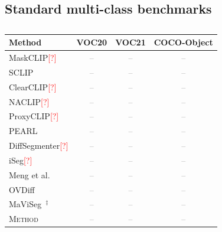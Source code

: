 \documentclass[runningheads]{llncs}
\newcommand{\method}{\textsc{Method}}          %
\newcommand{\x}{\textcolor{gray}{--}}          %
\newcommand{\citeneeded}{\textcolor{red}{[?]}} %
\newcommand{\figbox}[2]{\fbox{\parbox[c][#2][c]{0.95\linewidth}{\centering\small\textcolor{gray}{#1}}}}
\begin{document}
\subsection{Standard multi-class benchmarks}
\label{sec:res-multiclass}

\begin{table}[t]
\centering
\caption{}
\label{tab:multiclass}
\footnotesize\setlength{\tabcolsep}{4pt}
\begin{tabular}{@{}lccc@{}}
\toprule
Method & VOC20 & VOC21 & COCO-Object \\
\midrule
MaskCLIP\citeneeded                 & \x & \x & \x \\
SCLIP~\cite{wang2024sclip}                    & \x & \x & \x \\
ClearCLIP\citeneeded                & \x & \x & \x \\
NACLIP\citeneeded                   & \x & \x & \x \\
ProxyCLIP\citeneeded                & \x & \x & \x \\
PEARL~\cite{pei2026pearl}           & \x & \x & \x \\
DiffSegmenter\citeneeded            & \x & \x & \x \\
iSeg\citeneeded                     & \x & \x & \x \\
Meng et al.~\cite{meng2026making}   & \x & \x & \x \\
OVDiff~\cite{karazija2024ovdiff}    & \x & \x & \x \\
MaViSeg~\cite{chakraborty2026maviseg}$^\ddagger$ & \x & \x & \x \\
\midrule
\method{}                           & \x & \x & \x \\
\bottomrule
\end{tabular}
\end{table}

\begin{figure}[t]
\centering
\figbox{Qualitative comparison: rows = photos (seen and unseen classes, VOC and COCO); columns = photo, ground truth, two strongest baselines, ours.}{4.5cm}
\caption{}
\label{fig:qualitative}
\end{figure}
\end{document}
